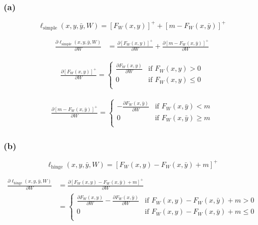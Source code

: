 \subsubsection*{(a)}


$$
    \ell_\text{simple}(x, y, \bar y, W) = \left[ F_W(x, y)\right]^+ + \left[m - F_W(x, \bar y)\right]^+
$$

\begin{align}
    \frac{\partial \ell_\text{simple}(x, y, \bar y, W)}{\partial W}
     & = \frac{\partial \left[F_W(x, y)\right]^+}{\partial W}
    + \frac{\partial \left[m -F_W(x, \bar y)\right]^+}{\partial W}
\end{align}

\begin{align}
    \frac{\partial \left[F_W(x, y)\right]^+}{\partial W} =
    \begin{cases}
        \frac{\partial F_W(x, y)}{\partial W} & \text{if } F_W(x, y) > 0    \\
        0                                     & \text{if } F_W(x, y) \leq 0 \\
    \end{cases}
\end{align}

\begin{align}
    \frac{\partial \left[m -F_W(x, \bar y)\right]^+}{\partial W} =
    \begin{cases}
        - \frac{\partial F_W(x, \bar y)}{\partial W} & \text{if } F_W(x, \bar y) < m    \\
        0                                            & \text{if } F_W(x, \bar y) \geq m \\
    \end{cases}
\end{align}

\subsubsection*{(b)}
$$
    \ell_\text{hinge}(x, y, \bar y, W) = \left[ F_W(x, y) - F_W(x, \bar y) + m\right ]^+
$$

\begin{align}
    \frac{\partial \ell_\text{hinge}(x, y, \bar y, W)}{\partial W}
     & = \frac{\partial \left[F_W(x, y) - F_W(x, \bar y) + m\right]^+}{\partial W}                                                             \\
     & = \begin{cases}
             \frac{\partial F_W(x, y)}{\partial W} - \frac{\partial F_W(x, \bar y)}{\partial W} & \text{if } F_W(x, y) - F_W(x, \bar y) + m >0     \\
             0                                                                                  & \text{if } F_W(x, y) - F_W(x, \bar y) + m \leq 0 \\
         \end{cases}
\end{align}


